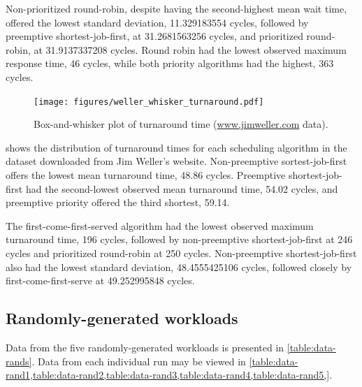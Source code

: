 \documentclass[12pt,letterpaper]{article}
\begin{document}
			Non-prioritized round-robin, despite having the second-highest mean wait time, offered the lowest standard deviation, 11.329183554 cycles, followed by preemptive shortest-job-first, at 31.2681563256 cycles, and prioritized round-robin, at 31.9137337208 cycles. Round robin had the lowest observed maximum response time, 46 cycles, while both priority algorithms had the highest, 363 cycles.

			\begin{figure}[H]
				\centerline{\texttt{[image: figures/weller\_whisker\_turnaround.pdf]}}
				\caption{Box-and-whisker plot of turnaround time (\url{www.jimweller.com} data).}
				\label{fig:jim_whisker_turn}
			\end{figure}

			 shows the distribution of turnaround times for each scheduling algorithm in the dataset downloaded from Jim Weller's website. Non-preemptive sortest-job-first offers the lowest mean turnaround time, 48.86 cycles. Preemptive shortest-job-first had the second-lowest observed mean turnaround time, 54.02 cycles, and preemptive priority offered the third shortest, 59.14.

			The first-come-first-served algorithm had  the lowest observed maximum turnaround time, 196 cycles, followed by non-preemptive shortest-job-first at 246 cycles and prioritized round-robin at 250 cycles. Non-preemptive shortest-job-first also had the lowest standard deviation, 48.4555425106 cycles, followed closely by first-come-first-serve at 49.252995848 cycles.

  		\subsection{Randomly-generated workloads}

  			Data from the five randomly-generated workloads is presented in \cref{table:data-rands}. Data from each individual run may be viewed in \cref{table:data-rand1,table:data-rand2,table:data-rand3,table:data-rand4,table:data-rand5,}.
\end{document}
